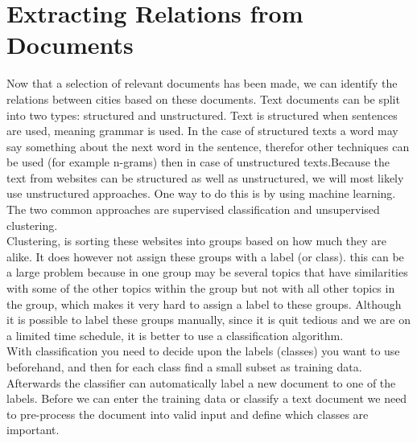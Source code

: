 \section{Extracting Relations from Documents}
Now that a selection of relevant documents has been made, we can identify the relations between cities based on these documents. Text documents can be split into two types: structured and unstructured. Text is structured when sentences are used, meaning grammar is used. In the case of structured texts a word may say something about the next word in the sentence, therefor other techniques can be used (for example n-grams) then in case of unstructured texts.Because the text from websites can be structured as well as unstructured, we will most likely use unstructured approaches. One way to do this is by using machine learning. The two common approaches are supervised classification and unsupervised clustering. \\

Clustering, is sorting these websites into groups based on how much they are alike. It does however not assign these groups with a label (or class). this can be a large problem because in one group may be several topics that have similarities with some of the other topics within the group but not with all other topics in the group, which makes it very hard to assign a label to these groups. Although it is possible to label these groups manually, since it is quit tedious and we are on a limited time schedule, it is better to use a classification algorithm. \\

With classification you need to decide upon the labels (classes) you want to use beforehand, and then for each class find a small subset as training data. Afterwards the classifier can automatically label a new document to one of the labels. Before we can enter the training data or classify a text document we need to pre-process the document into valid input and define which classes are important.

